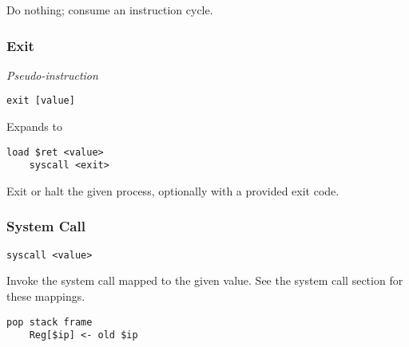 Do nothing; consume an instruction cycle.

\subsubsection{Exit}

\textit{Pseudo-instruction}

\begin{lstlisting}[style=assembly]
    exit [value]
\end{lstlisting}

Expands to

\begin{lstlisting}[style=assembly]
    load $ret <value>
    syscall <exit>
\end{lstlisting}

Exit or halt the given process, optionally with a provided exit code.

\subsubsection{System Call}

\begin{lstlisting}[style=assembly]
    syscall <value>
\end{lstlisting}

Invoke the system call mapped to the given value.
See the system call section for these mappings.

\begin{lstlisting}[style=rtn]
    pop stack frame
    Reg[$ip] <- old $ip
\end{lstlisting}
